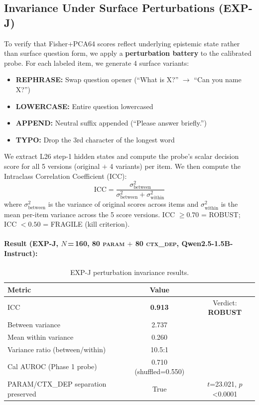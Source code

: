 \documentclass[11pt]{article}
\begin{document}
\subsection{Invariance Under Surface Perturbations (EXP-J)}

To verify that Fisher+PCA64 scores reflect underlying epistemic state rather than surface
question form, we apply a \textbf{perturbation battery} to the calibrated probe. For each
labeled item, we generate 4 surface variants:

\begin{itemize}[leftmargin=2em]
\item \textbf{REPHRASE:} Swap question opener
  (``What is X?'' $\to$ ``Can you name X?'')
\item \textbf{LOWERCASE:} Entire question lowercased
\item \textbf{APPEND:} Neutral suffix appended (``Please answer briefly.'')
\item \textbf{TYPO:} Drop the 3rd character of the longest word
\end{itemize}

We extract L26 step-1 hidden states and compute the probe's scalar decision score for
all 5 versions (original $+$ 4 variants) per item. We then compute the Intraclass
Correlation Coefficient (ICC):
\[
\mathrm{ICC} = \frac{\sigma^2_\text{between}}{\sigma^2_\text{between} + \sigma^2_\text{within}}
\]
where $\sigma^2_\text{between}$ is the variance of original scores across items and
$\sigma^2_\text{within}$ is the mean per-item variance across the 5 score versions.
ICC $\geq 0.70$ = ROBUST; ICC $< 0.50$ = FRAGILE (kill criterion).

\paragraph{Result (EXP-J, $N$\,=\,160, 80 \textsc{param} $+$ 80 \textsc{ctx\_dep},
Qwen2.5-1.5B-Instruct):}

\begin{table}[h!]
\centering
\caption{EXP-J perturbation invariance results.}
\begin{tabular}{lcc}
\toprule
Metric & Value & \\
\midrule
ICC & \textbf{0.913} & Verdict: \textbf{ROBUST} \\
Between variance & 2.737 & \\
Mean within variance & 0.260 & \\
Variance ratio (between/within) & 10.5:1 & \\
Cal AUROC (Phase 1 probe) & 0.710 (shuffled=0.550) & \\
PARAM/CTX\_DEP separation preserved & True & $t$=23.021, $p$<0.0001 \\
\bottomrule
\end{tabular}
\end{table}
\end{document}
